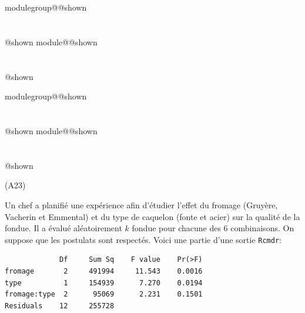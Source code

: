 \documentclass{Evaluation}
\makeatletter
\newcommand{\currentmodulekey}{}
\newcommand{\currentmoduletitle}{}
\newcommand{\currentgroupkey}{}
\newcommand{\currentgrouptitle}{}
\newcommand{\showmoduleifneeded}{%
  \ifx\currentgroupkey\empty\else
    \expandafter\ifx\csname modulegroup@\currentgroupkey @shown\endcsname\relax
      \section*{\currentgrouptitle}%
      \expandafter\gdef\csname modulegroup@\currentgroupkey @shown\endcsname{1}%
    \fi
  \fi
  \expandafter\ifx\csname module@\currentmodulekey @shown\endcsname\relax
    \section*{\currentmoduletitle}%
    \expandafter\gdef\csname module@\currentmodulekey @shown\endcsname{1}%
  \fi
}
\newenvironment{A23}{\showmoduleifneeded}{}
\makeatother
\begin{document}
\begin{questions}
\begin{A23}

\end{A23}

\begin{A23}
\question
(A23) 

Un chef a planifié une expérience afin d'étudier l'effet du fromage (Gruyère, Vacherin et Emmental) et du type de caquelon (fonte et acier) sur la qualité de la fondue. Il a évalué aléatoirement $k$ fondue pour chacune des 6 combinaisons. On suppose que les postulats sont respectés. Voici une partie d'une sortie \texttt{Rcmdr}:
\begin{verbatim}
             Df     Sum Sq    F value    Pr(>F)   
fromage       2     491994     11.543    0.0016 
type          1     154939      7.270    0.0194  
fromage:type  2      95069      2.231    0.1501   
Residuals    12     255728  
\end{verbatim}
\begin{parts}

\end{parts}
\end{A23}
\end{questions}
\end{document}
